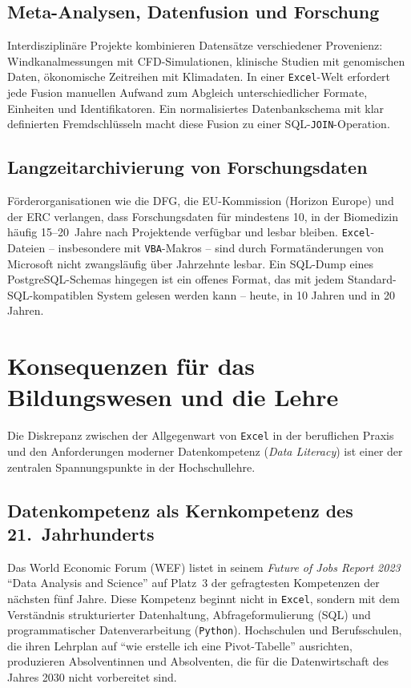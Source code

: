 ﻿\documentclass[12pt,a4paper]{report}
\theoremstyle{definition}
\theoremstyle{remark}
\newcommand{\excel}{\texttt{Excel}}
\newcommand{\vba}{\texttt{VBA}}
\newcommand{\py}{\texttt{Python}}
\newcommand{\code}[1]{\texttt{#1}}
\begin{document}
\subsection{Meta-Analysen, Datenfusion und Forschung}

Interdisziplinäre Projekte kombinieren Datensätze verschiedener
Provenienz: Windkanalmessungen mit CFD-Simulationen, klinische
Studien mit genomischen Daten, ökonomische Zeitreihen mit Klimadaten.
In einer \excel-Welt erfordert jede Fusion manuellen Aufwand zum
Abgleich unterschiedlicher Formate, Einheiten und Identifikatoren.
Ein normalisiertes Datenbankschema mit klar definierten Fremdschlüsseln
macht diese Fusion zu einer SQL-\code{JOIN}-Operation.

\subsection{Langzeitarchivierung von Forschungsdaten}

Förderorganisationen wie die DFG, die EU-Kommission (Horizon Europe)
und der ERC verlangen, dass Forschungsdaten für mindestens 10,
in der Biomedizin häufig 15--20~Jahre nach Projektende verfügbar und
lesbar bleiben.
\excel-Dateien -- insbesondere mit \vba-Makros -- sind durch
Formatänderungen von Microsoft nicht zwangsläufig über Jahrzehnte
lesbar.
Ein SQL-Dump eines PostgreSQL-Schemas hingegen ist ein offenes Format,
das mit jedem Standard-SQL-kompatiblen System gelesen werden kann --
heute, in 10 Jahren und in 20 Jahren.

\section{Konsequenzen für das Bildungswesen und die Lehre}

Die Diskrepanz zwischen der Allgegenwart von \excel{} in der beruflichen
Praxis und den Anforderungen moderner Datenkompetenz
(\textit{Data Literacy}) ist einer der zentralen Spannungspunkte
in der Hochschullehre.

\subsection{Datenkompetenz als Kernkompetenz des 21.\ Jahrhunderts}

Das World Economic Forum (WEF) listet in seinem
\textit{Future of Jobs Report 2023} ``Data Analysis and Science''
auf Platz~3 der gefragtesten Kompetenzen der nächsten fünf Jahre.
Diese Kompetenz beginnt nicht in \excel{}, sondern mit dem Verständnis
strukturierter Datenhaltung, Abfrageformulierung (SQL) und
programmatischer Datenverarbeitung (\py).
Hochschulen und Berufsschulen, die ihren Lehrplan auf
``wie erstelle ich eine Pivot-Tabelle'' ausrichten, produzieren
Absolventinnen und Absolventen, die für die Datenwirtschaft
des Jahres 2030 nicht vorbereitet sind.
\end{document}
